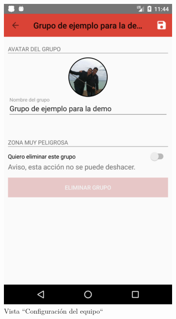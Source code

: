 \documentclass[twoside]{report}
\begin{document}
\begin{figure}[H]
\begin{center}
\begin{subfigure}[t]{.3\linewidth}
		\includegraphics[scale=0.25]{images/userguide/17.png}
		\caption{Vista “Configuración del equipo“}
	\end{subfigure}\hspace{2mm}%
	\begin{subfigure}[t]{.3\linewidth}

\end{subfigure}
\end{center}
\end{figure}
\end{document}
